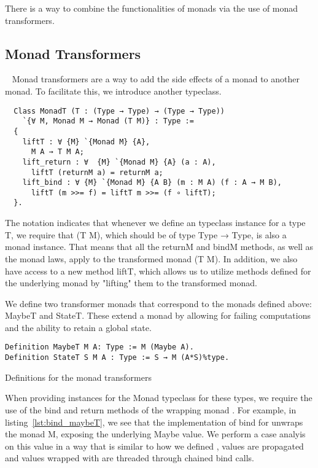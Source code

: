 There is a way to combine the functionalities of monads via the use of monad
transformers. 

\subsection{Monad Transformers}~\label{sec:monad_transformers}
Monad transformers\cite{liang1995monad} are a way to add the side effects of a
monad to another monad. To facilitate this, we introduce another typeclass.

\begin{listing}
\begin{verbatim}
  Class MonadT (T : (Type → Type) → (Type → Type)) 
    `{∀ M, Monad M → Monad (T M)} : Type :=
  {
    liftT : ∀ {M} `{Monad M} {A}, 
      M A → T M A;
    lift_return : ∀  {M} `{Monad M} {A} (a : A), 
      liftT (returnM a) = returnM a;
    lift_bind : ∀ {M} `{Monad M} {A B} (m : M A) (f : A → M B),
      liftT (m >>= f) = liftT m >>= (f ∘ liftT);
  }.
\end{verbatim}
\end{listing}

The notation  indicates that whenever we define an
typeclass instance for a type T, we require that (T M), which should be of type
Type → Type, is also a monad instance. That means that all the returnM and
bindM methods, as well as the monad laws, apply to the transformed monad (T M).
In addition, we also have access to a new method liftT, which allows us to
utilize methods defined for the underlying monad by "lifting" them to the
transformed monad. 

We define two transformer monads that correspond to the monads defined above:
MaybeT and StateT. These extend a monad by allowing for failing computations
and the ability to retain a global state. 

\begin{listing}
\begin{verbatim}
Definition MaybeT M A: Type := M (Maybe A).
Definition StateT S M A : Type := S → M (A*S)%type.
\end{verbatim}
\caption{Definitions for the monad transformers}
\end{listing}

When providing instances for the Monad typeclass for these types, we require
the use of the bind and return methods of the wrapping monad .
For example, in listing~\ref{lst:bind_maybeT}, we see that the implementation 
of  bind for 
unwraps the monad M, exposing the underlying Maybe value. We perform a case
analyis on this value in a way that is similar to how we defined
,
 values are propagated and values wrapped with  are 
threaded through chained bind calls.

